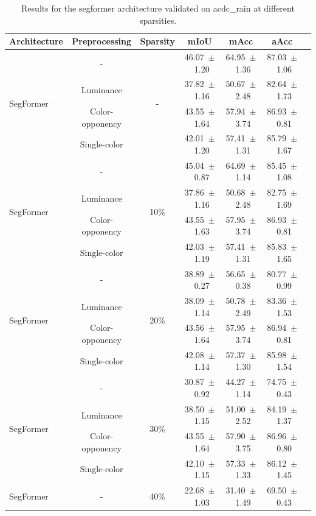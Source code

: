 \begin{table}[h]
\centering
\caption{Results for the segformer architecture validated on acdc_rain at different sparsities.}
\begin{tabular}{@{}lccc ccc@{}}
\toprule
Architecture & Preprocessing & Sparsity & mIoU & mAcc & aAcc \\
\midrule

\multirow{4}{*}{SegFormer} & - & \multirow{4}{*}{-} & 46.07~$\pm$~1.20 & 64.95~$\pm$~1.36 & 87.03~$\pm$~1.06 \\
& Luminance & & 37.82~$\pm$~1.16 & 50.67~$\pm$~2.48 & 82.64~$\pm$~1.73 \\
& Color-opponency & & 43.55~$\pm$~1.64 & 57.94~$\pm$~3.74 & 86.93~$\pm$~0.81 \\
& Single-color & & 42.01~$\pm$~1.20 & 57.41~$\pm$~1.31 & 85.79~$\pm$~1.67 \\
\midrule
\multirow{4}{*}{SegFormer} & - & \multirow{4}{*}{10\%} & 45.04~$\pm$~0.87 & 64.69~$\pm$~1.14 & 85.45~$\pm$~1.08 \\
& Luminance & & 37.86~$\pm$~1.16 & 50.68~$\pm$~2.48 & 82.75~$\pm$~1.69 \\
& Color-opponency & & 43.55~$\pm$~1.63 & 57.95~$\pm$~3.74 & 86.93~$\pm$~0.81 \\
& Single-color & & 42.03~$\pm$~1.19 & 57.41~$\pm$~1.31 & 85.83~$\pm$~1.65 \\
\midrule
\multirow{4}{*}{SegFormer} & - & \multirow{4}{*}{20\%} & 38.89~$\pm$~0.27 & 56.65~$\pm$~0.38 & 80.77~$\pm$~0.99 \\
& Luminance & & 38.09~$\pm$~1.14 & 50.78~$\pm$~2.49 & 83.36~$\pm$~1.53 \\
& Color-opponency & & 43.56~$\pm$~1.64 & 57.95~$\pm$~3.74 & 86.94~$\pm$~0.81 \\
& Single-color & & 42.08~$\pm$~1.14 & 57.37~$\pm$~1.30 & 85.98~$\pm$~1.54 \\
\midrule
\multirow{4}{*}{SegFormer} & - & \multirow{4}{*}{30\%} & 30.87~$\pm$~0.92 & 44.27~$\pm$~1.14 & 74.75~$\pm$~0.43 \\
& Luminance & & 38.50~$\pm$~1.15 & 51.00~$\pm$~2.52 & 84.19~$\pm$~1.37 \\
& Color-opponency & & 43.55~$\pm$~1.64 & 57.90~$\pm$~3.75 & 86.96~$\pm$~0.80 \\
& Single-color & & 42.10~$\pm$~1.15 & 57.33~$\pm$~1.33 & 86.12~$\pm$~1.45 \\
\midrule
\multirow{4}{*}{SegFormer} & - & \multirow{4}{*}{40\%} & 22.68~$\pm$~1.03 & 31.40~$\pm$~1.49 & 69.50~$\pm$~0.43 \\

\end{tabular}
\end{table}
